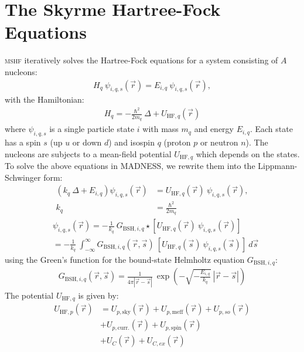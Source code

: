\documentclass[3p]{elsarticle}
\begin{document}
\section{The Skyrme Hartree-Fock Equations}
\textsc{mshf} iteratively solves the Hartree-Fock equations for a system consisting of $A$ nucleons:
\begin{align}
H_q \:  \psi_{i,q,s} (\vec{r}) = E_{i,q} \: \psi_{i,q,s} (\vec{r}),
\label{HFeq1}
\end{align}
with the Hamiltonian:
\begin{align}
H_q = -  \frac{\hbar^2}{2 m_q}  \: \Delta + U_{\mathrm{HF},q} (\vec{r})
\label{HFeq2}
\end{align}
where $\psi_{i,q,s}$ is a single particle state $i$ with mass $m_q$ and energy $E_{i,q}$. Each state has a spin $s$ (up $u$ or down $d$) and isospin $q$ (proton $p$ or neutron $n$). The nucleons are subjects to a mean-field potential $U_{\mathrm{HF},q}$ which depends on the states. To solve the above equations in \textsc{MADNESS}, we rewrite them into the Lippmann-Schwinger form:
\begin{align}
\left( k_q \: \Delta+ E_{i,q} \right) \psi_{i,q,s} (\vec{r}) &= U_{\mathrm{HF},q} (\vec{r}) \: \psi_{i,q,s} (\vec{r}), \\
 k_q & =  \frac{\hbar^2}{2 m_q} 
\end{align}
\begin{align}
&\psi_{i,q,s} (\vec{r}) = - \frac{1}{k_q} \: G_{\mathrm{BSH},i,q}  \star \left[ U_{\mathrm{HF},q} (\vec{r}) \: \psi_{i,q,s} (\vec{r}) \right] \\
&= - \frac{1}{k_q} \: \int_{-\infty}^{\infty} G_{\mathrm{BSH},i,q} (\vec{r}, \vec{s} ) \: \left[U_{\mathrm{HF},q} (\vec{s}) \: \psi_{i,q,s} (\vec{s})\right] \: d\vec{s} 
\label{conv1}
\end{align}
using the Green's function for the bound-state Helmholtz equation $G_{\mathrm{BSH},i,q}$:
\begin{align}
G_{\mathrm{BSH},i,q}  ( \vec{r} , \vec{s} ) = \frac{1}{ 4 \pi |\vec{r} - \vec{s}|} \: \exp\left(-\sqrt{ - \frac{E_{i,q} }{ k_q}} \: | \vec{r} - \vec{s} |\right)
\label{Greens}
\end{align}
The potential $U_{\mathrm{HF},q}$ is given by: 
\begin{align} 
U_{\mathrm{HF}, p} (\vec{r}) &= U_{p,\mathrm{sky}} (\vec{r}) + U_{p, \mathrm{meff}} (\vec{r}) + U_{p, so} (\vec{r}) \nonumber\\
& + U_{p, \mathrm{curr.}} (\vec{r}) + U_{p, \mathrm{spin}} (\vec{r}) \nonumber\\
&+ U_{C} (\vec{r}) + U_{C,ex} (\vec{r})
\label{Uprotons}
\end{align}
\end{document}

